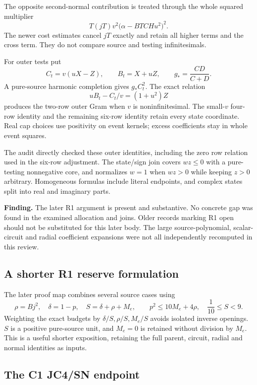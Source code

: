 The opposite second-normal contribution is treated through the whole
squared multiplier
\[
 T(jT)v^2\bigl(\alpha-BTCHu^2\bigr)^2.
\]
The newer cost estimates cancel \(jT\) exactly and retain all higher
terms and the cross term. They do not compare source and testing
infinitesimals. 

For outer tests put
\[
 C_t=v(uX-Z),\qquad B_t=X+uZ,\qquad g_*=\frac{CD}{C+D}.
\]
A pure-source harmonic completion gives \(g_*C_t^2\).
The exact relation
\[
 uB_t-C_t/v=(1+u^2)Z
\]
produces the two-row outer Gram when \(v\) is noninfinitesimal.
The small-\(v\) four-row identity and the remaining six-row identity
retain every state coordinate. Real cap choices use positivity on
event kernels; excess coefficients stay in whole event squares.

The audit directly checked these outer identities, including the
zero row relation used in the six-row adjustment. The state/sign
join covers \(wz\le0\) with a pure-testing nonnegative core, and
normalizes \(w=1\) when \(wz>0\) while keeping \(z>0\) arbitrary.
Homogeneous formulas include literal endpoints, and complex states
split into real and imaginary parts. 

\textbf{Finding.}
The later R1 argument is present and substantive. No concrete gap
was found in the examined allocation and joins. Older records marking
R1 open should not be substituted for this later body.
The large source-polynomial, scalar-circuit and radial coefficient
expansions were not all independently recomputed in this review.

\subsection{A shorter R1 reserve formulation}

The later proof map combines several source cases using
\[
 \rho=Bj^2,\quad\delta=1-p,\quad S=\delta+\rho+M_e,
 \qquad p^2\le10M_e+4\rho,\quad \frac1{10}\le S<9.
\]
Weighting the exact budgets by \(\delta/S,\rho/S,M_e/S\)
avoids isolated inverse openings. \(S\) is a positive pure-source
unit, and \(M_e=0\) is retained without division by \(M_e\).
This is a useful shorter exposition, retaining the full parent,
circuit, radial and normal identities as inputs. 

\subsection{The C1 JC4/SN endpoint}

